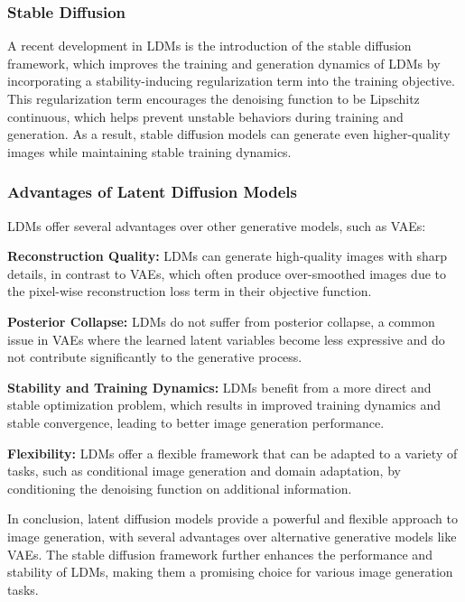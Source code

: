 \documentclass[12pt]{article}
\begin{document}
\subsubsection{Stable Diffusion}

A recent development in LDMs is the introduction of the stable diffusion framework, which improves the training and generation dynamics of LDMs by incorporating a stability-inducing regularization term into the training objective. This regularization term encourages the denoising function to be Lipschitz continuous, which helps prevent unstable behaviors during training and generation. As a result, stable diffusion models can generate even higher-quality images while maintaining stable training dynamics.

\subsubsection{Advantages of Latent Diffusion Models}

LDMs offer several advantages over other generative models, such as VAEs:

\textbf{Reconstruction Quality:} LDMs can generate high-quality images with sharp details, in contrast to VAEs, which often produce over-smoothed images due to the pixel-wise reconstruction loss term in their objective function.

\textbf{Posterior Collapse:} LDMs do not suffer from posterior collapse, a common issue in VAEs where the learned latent variables become less expressive and do not contribute significantly to the generative process.

\textbf{Stability and Training Dynamics:} LDMs benefit from a more direct and stable optimization problem, which results in improved training dynamics and stable convergence, leading to better image generation performance.

\textbf{Flexibility:} LDMs offer a flexible framework that can be adapted to a variety of tasks, such as conditional image generation and domain adaptation, by conditioning the denoising function on additional information.

In conclusion, latent diffusion models provide a powerful and flexible approach to image generation, with several advantages over alternative generative models like VAEs. The stable diffusion framework further enhances the performance and stability of LDMs, making them a promising choice for various image generation tasks.
\end{document}
